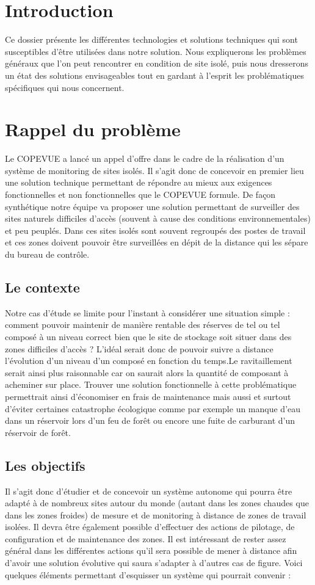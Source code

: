 \section{Introduction}
Ce dossier présente les différentes technologies et solutions techniques qui sont susceptibles d’être utilisées dans notre solution. Nous expliquerons les problèmes généraux que l’on peut rencontrer en condition de site isolé, puis nous dresserons un état des solutions envisageables tout en gardant à l'esprit les problématiques spécifiques qui nous concernent.

\section{Rappel du problème}
Le COPEVUE a lancé un appel d'offre dans le cadre de la réalisation d'un système de monitoring de sites isolés. Il s'agit donc de concevoir en premier lieu une solution technique permettant de répondre au mieux aux exigences fonctionnelles et non fonctionnelles que le COPEVUE formule. De façon synthétique notre équipe va proposer une solution permettant de surveiller des sites naturels difficiles d'accès (souvent à cause des conditions environnementales) et peu peuplés. Dans ces sites isolés sont souvent regroupés des postes de travail et ces zones doivent pouvoir être surveillées en dépit de la distance qui les sépare du bureau de contrôle.
\subsection{Le contexte}
Notre cas d'étude se limite pour l'instant à considérer une situation simple : comment pouvoir maintenir de manière rentable des réserves de tel ou tel composé à un niveau correct bien que le site de stockage soit situer dans des zones difficiles d'accès ? L'idéal serait donc de pouvoir suivre a distance l'évolution d'un niveau d'un composé en fonction du temps.Le ravitaillement serait ainsi plus raisonnable car on saurait alors la quantité de composant à acheminer sur place. Trouver une solution fonctionnelle à cette problématique permettrait ainsi d'économiser en frais de maintenance mais aussi et surtout d'éviter certaines catastrophe écologique comme par exemple un manque d'eau dans un réservoir lors d'un feu de forêt ou encore une fuite de carburant d'un réservoir de forêt.

\subsection{Les objectifs}
Il s'agit donc d'étudier et de concevoir un système autonome qui pourra être adapté à de nombreux sites autour du monde (autant dans les zones chaudes que dans les zones froides) de mesure et de monitoring à distance de zones de travail isolées. Il devra être également possible d'effectuer des actions de pilotage, de configuration et de maintenance des zones. Il est intéressant de rester assez général dans les différentes actions qu'il sera possible de mener à distance afin d'avoir une solution évolutive qui saura s'adapter à d'autres cas de figure.
Voici quelques éléments permettant d'esquisser un système qui pourrait convenir :

